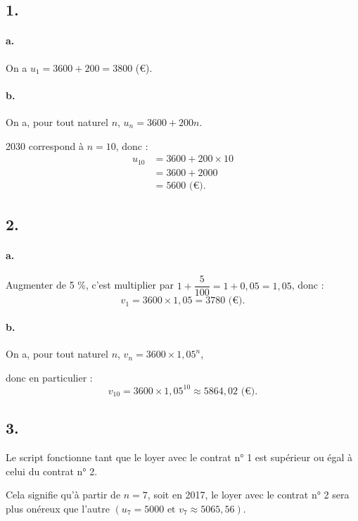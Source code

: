 \subsection*{1.}

\paragraph{a.} On a \( u_1 = 3600 + 200 = 3800 \) (€).

\paragraph{b.} On a, pour tout naturel \( n \), \( u_n = 3600 + 200n \).

2030 correspond à \( n = 10 \), donc :
\begin{align*}
u_{10} &= 3600 + 200 \times 10 \\
&= 3600 + 2000 \\
&= 5600 \text{ (€)}.
\end{align*}

\subsection*{2.}

\paragraph{a.} Augmenter de 5 \%, c'est multiplier par \( 1 + \dfrac{5}{100} = 1 + 0,05 = 1{,}05 \), donc :
\[
v_1 = 3600 \times 1{,}05 = 3780 \text{ (€)}.
\]

\paragraph{b.} On a, pour tout naturel \( n \), \( v_n = 3600 \times 1{,}05^n \),

donc en particulier :
\[
v_{10} = 3600 \times 1{,}05^{10} \approx 5864{,}02 \text{ (€)}.
\]

\subsection*{3.}

Le script fonctionne tant que le loyer avec le contrat n° 1 est supérieur ou égal à celui du contrat n° 2.

Cela signifie qu'à partir de \( n = 7 \), soit en 2017, le loyer avec le contrat n° 2 sera plus onéreux que l'autre \( (u_7 = 5000 \text{ et } v_7 \approx 5065{,}56) \).
